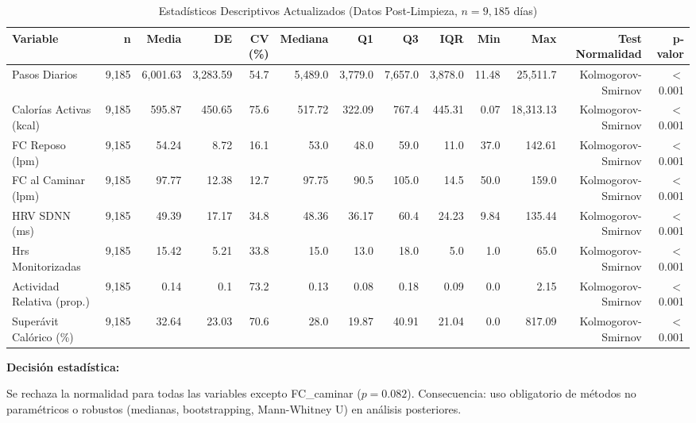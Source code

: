 \documentclass[12pt,letterpaper,twoside]{report}
\begin{document}
\begin{landscape}
\begin{table}[htbp]
\centering
\caption{Estadísticos Descriptivos Actualizados (Datos Post-Limpieza, $n=9,185$ días)}
\label{tab:descriptivos_actualizados}
\small
\begin{tabular}{lrrrrrrrrrrrr}
\toprule
\textbf{Variable} & \textbf{n} & \textbf{Media} & \textbf{DE} & \textbf{CV (\%)} & \textbf{Mediana} & \textbf{Q1} & \textbf{Q3} & \textbf{IQR} & \textbf{Min} & \textbf{Max} & \textbf{Test Normalidad} & \textbf{p-valor} \\
\midrule
Pasos Diarios & 9,185 & 6,001.63 & 3,283.59 & 54.7 & 5,489.0 & 3,779.0 & 7,657.0 & 3,878.0 & 11.48 & 25,511.7 & Kolmogorov-Smirnov & $<$ 0.001 \\
Calorías Activas (kcal) & 9,185 & 595.87 & 450.65 & 75.6 & 517.72 & 322.09 & 767.4 & 445.31 & 0.07 & 18,313.13 & Kolmogorov-Smirnov & $<$ 0.001 \\
FC Reposo (lpm) & 9,185 & 54.24 & 8.72 & 16.1 & 53.0 & 48.0 & 59.0 & 11.0 & 37.0 & 142.61 & Kolmogorov-Smirnov & $<$ 0.001 \\
FC al Caminar (lpm) & 9,185 & 97.77 & 12.38 & 12.7 & 97.75 & 90.5 & 105.0 & 14.5 & 50.0 & 159.0 & Kolmogorov-Smirnov & $<$ 0.001 \\
HRV SDNN (ms) & 9,185 & 49.39 & 17.17 & 34.8 & 48.36 & 36.17 & 60.4 & 24.23 & 9.84 & 135.44 & Kolmogorov-Smirnov & $<$ 0.001 \\
Hrs Monitorizadas & 9,185 & 15.42 & 5.21 & 33.8 & 15.0 & 13.0 & 18.0 & 5.0 & 1.0 & 65.0 & Kolmogorov-Smirnov & $<$ 0.001 \\
Actividad Relativa (prop.) & 9,185 & 0.14 & 0.1 & 73.2 & 0.13 & 0.08 & 0.18 & 0.09 & 0.0 & 2.15 & Kolmogorov-Smirnov & $<$ 0.001 \\
Superávit Calórico (\%) & 9,185 & 32.64 & 23.03 & 70.6 & 28.0 & 19.87 & 40.91 & 21.04 & 0.0 & 817.09 & Kolmogorov-Smirnov & $<$ 0.001 \\
\bottomrule
\end{tabular}
\end{table}
\end{landscape}

\begin{decisionbox}
\textbf{Decisión estadística:}

Se rechaza la normalidad para todas las variables excepto FC\_caminar ($p=0.082$). Consecuencia: uso obligatorio de métodos no paramétricos o robustos (medianas, bootstrapping, Mann-Whitney U) en análisis posteriores.
\end{decisionbox}
\end{document}

